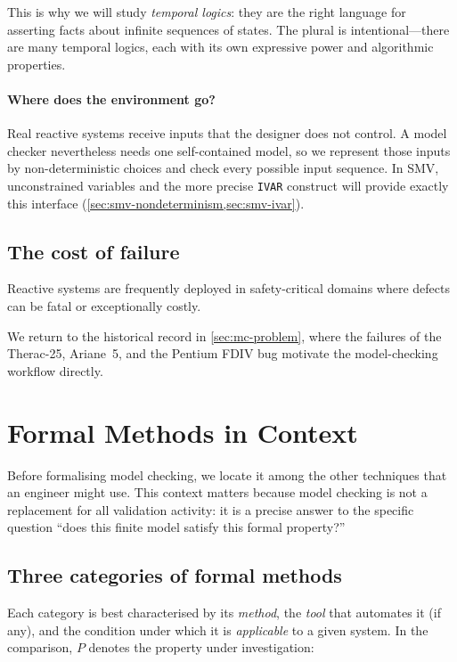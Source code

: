 This is why we will study \emph{temporal logics}: they are the right language
for asserting facts about infinite sequences of states.  The plural is
intentional---there are many temporal logics, each with its own expressive
power and algorithmic properties.

\paragraph{Where does the environment go?}
Real reactive systems receive inputs that the designer does not control.  A
model checker nevertheless needs one self-contained model, so we represent
those inputs by non-deterministic choices and check every possible input
sequence.  In SMV, unconstrained variables and the more precise
\texttt{IVAR} construct will provide exactly this interface
(\cref{sec:smv-nondeterminism,sec:smv-ivar}).

\subsection{The cost of failure}

Reactive systems are frequently deployed in safety-critical domains where
defects can be fatal or exceptionally costly.

We return to the historical record in \cref{sec:mc-problem}, where the
failures of the Therac-25, Ariane~5, and the Pentium FDIV bug motivate the
model-checking workflow directly.

\section{Formal Methods in Context}
\label{sec:formal-methods-context}

Before formalising model checking, we locate it among the other techniques
that an engineer might use.  This context matters because model checking is
not a replacement for all validation activity: it is a precise answer to the
specific question ``does this finite model satisfy this formal property?''

\subsection{Three categories of formal methods}

Each category is best characterised by its \emph{method}, the \emph{tool}
that automates it (if any), and the condition under which it is
\emph{applicable} to a given system.  In the comparison, $P$ denotes the
property under investigation:

